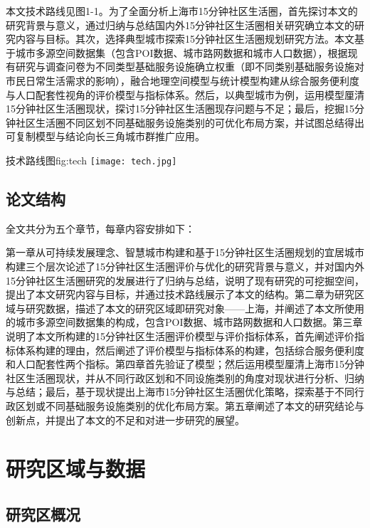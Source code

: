\documentclass{shnuthesis}
\begin{document}
本文技术路线见图1-1。为了全面分析上海市15分钟社区生活圈，首先探讨本文的研究背景与意义，通过归纳与总结国内外15分钟社区生活圈相关研究确立本文的研究内容与目标。其次，选择典型城市探索15分钟社区生活圈规划研究方法。本文基于城市多源空间数据集（包含POI数据、城市路网数据和城市人口数据），根据现有研究与调查问卷为不同类型基础服务设施确立权重（即不同类别基础服务设施对市民日常生活需求的影响），融合地理空间模型与统计模型构建从综合服务便利度与人口配套性视角的评价模型与指标体系。然后，以典型城市为例，运用模型厘清15分钟社区生活圈现状，探讨15分钟社区生活圈现存问题与不足；最后，挖掘15分钟社区生活圈不同区划不同基础服务设施类别的可优化布局方案，并试图总结得出可复制模型与结论向长三角城市群推广应用。

\begin{generalfig}[htb]{技术路线图}{fig:tech}
	\texttt{[image: tech.jpg]}
\end{generalfig}

\section{论文结构}

全文共分为五个章节，每章内容安排如下：

第一章从可持续发展理念、智慧城市构建和基于15分钟社区生活圈规划的宜居城市构建三个层次论述了15分钟社区生活圈评价与优化的研究背景与意义，并对国内外15分钟社区生活圈研究的发展进行了归纳与总结，说明了现有研究的可挖掘空间，提出了本文研究内容与目标，并通过技术路线展示了本文的结构。第二章为研究区域与研究数据，描述了本文的研究区域即研究对象——上海，并阐述了本文所使用的城市多源空间数据集的构成，包含POI数据、城市路网数据和人口数据。第三章说明了本文所构建的15分钟社区生活圈评价模型与评价指标体系，首先阐述评价指标体系构建的理由，然后阐述了评价模型与指标体系的构建，包括综合服务便利度和人口配套性两个指标。第四章首先验证了模型；然后运用模型厘清上海市15分钟社区生活圈现状，并从不同行政区划和不同设施类别的角度对现状进行分析、归纳与总结；最后，基于现状提出上海市15分钟社区生活圈优化策略，探索基于不同行政区划或不同基础服务设施类别的优化布局方案。第五章阐述了本文的研究结论与创新点，并提出了本文的不足和对进一步研究的展望。


\chapter{研究区域与数据}

\section{研究区概况}
\end{document}

